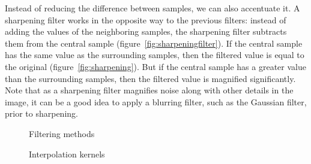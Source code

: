 \documentclass[english,12pt]{ifimaster}
\begin{document}
Instead of reducing the difference between samples, we can also
accentuate it. A sharpening filter works in the opposite way to the
previous filters: instead of adding the values of the neighboring
samples, the sharpening filter subtracts them from the central sample
(figure~\ref{fig:sharpeningfilter}). If the central sample has the same
value as the surrounding samples, then the filtered value is equal to
the original (figure~\ref{fig:sharpening}). But if the central sample
has a greater value than the surrounding samples, then the filtered
value is magnified significantly. Note that as a sharpening filter
magnifies noise along with other details in the image, it can be a
good idea to apply a blurring filter, such as the Gaussian filter,
prior to sharpening.

\begin{figure}[t]
  \centering
  \quad{}


  \caption{Filtering methods}
  \label{fig:boxfilterandgaussianfilter}
\end{figure}

\begin{figure}
  \centering
  \qquad

  \qquad

  \caption{Interpolation kernels}
  \label{fig:kernels}
\end{figure}
\end{document}
